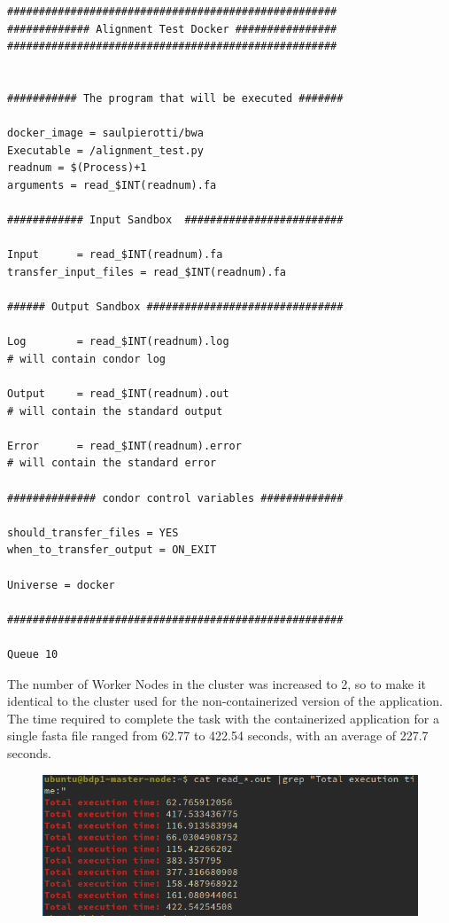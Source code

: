 \documentclass{article}
\begin{document}
\begin{lstlisting}
####################################################
############# Alignment Test Docker ################
####################################################


########### The program that will be executed #######

docker_image = saulpierotti/bwa
Executable = /alignment_test.py
readnum = $(Process)+1
arguments = read_$INT(readnum).fa

############ Input Sandbox  #########################

Input      = read_$INT(readnum).fa
transfer_input_files = read_$INT(readnum).fa

###### Output Sandbox ###############################

Log        = read_$INT(readnum).log
# will contain condor log

Output     = read_$INT(readnum).out
# will contain the standard output

Error      = read_$INT(readnum).error
# will contain the standard error

############## condor control variables #############

should_transfer_files = YES
when_to_transfer_output = ON_EXIT

Universe = docker

#####################################################

Queue 10
\end{lstlisting}

The number of Worker Nodes in the cluster was increased to 2, so to make it identical to the cluster used for the non-containerized version of the application.
The time required to complete the task with the containerized application for a single fasta file ranged from 62.77 to 422.54 seconds, with an average of 227.7 seconds.

\begin{figure}[!h]
    \center
    \includegraphics[width=\textwidth]{./images/time_condor.png}
\end{figure}
\FloatBarrier
\end{document}

